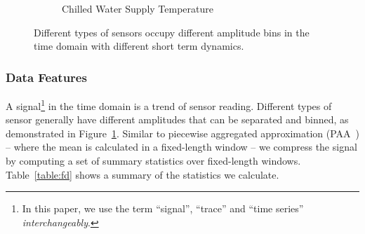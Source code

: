\begin{figure}[ht!]
\begin{subfigure}{0.32\textwidth}
                \caption{Chilled Water Supply Temperature}
  \end{subfigure}
\caption{Different types of sensors occupy different amplitude bins in the time domain with different short term dynamics.}
\label{fig:example}
\end{figure}

\subsubsection{Data Features}
A signal\footnote{In this paper, we use the term ``signal'', ``trace'' and ``time series'' \textit{interchangeably}.} in the time domain is a trend of sensor reading. 
Different types of sensor generally have different amplitudes that can be separated and binned,  
as demonstrated in Figure~\ref{fig:example}. 
Similar to piecewise aggregated approximation (PAA~\cite{paa}) -- where the mean is calculated in a fixed-length window -- 
we compress the signal by computing a set of summary statistics over fixed-length windows. 
Table~\ref{table:fd} shows a summary of the statistics we calculate. %



